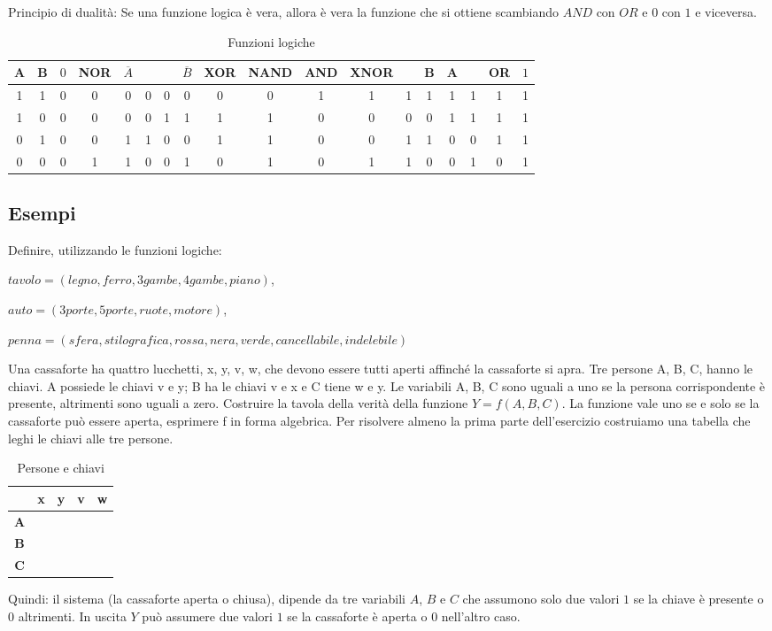 Principio di dualità: Se una funzione logica è vera, allora è vera la funzione che si ottiene scambiando $AND$ con  $OR$ e  $0$ con $1$ e viceversa.

\begin{table} %
	\begin{tabular}{cccccccccccccccccc}
	\toprule
	A & B & $0$ & NOR & $\overline{A}$ &  &  & $\overline{B}$ & XOR & NAND & AND & XNOR &  & B & A &  & OR & $1$ \\ 
	\midrule
	1 & 1 & 0 & 0 & 0 & 0 & 0 & 0 & 0 & 0 & 1 & 1 & 1 & 1 & 1 & 1 & 1 & 1 \\ 
	1 & 0 & 0 & 0 & 0 & 0 & 1 & 1 & 1 & 1 & 0 & 0 & 0 & 0 & 1 & 1 & 1 & 1 \\ 
	0 & 1 & 0 & 0 & 1 & 1 & 0 & 0 & 1 & 1 & 0 & 0 & 1 & 1 & 0 & 0 & 1 & 1 \\ 
	0 & 0 & 0 & 1 & 1 & 0 & 0 & 1 & 0 & 1 & 0 & 1 & 1 & 0 & 0 & 1 & 0 & 1 \\ 
	\bottomrule
	\end{tabular}
	\caption{Funzioni logiche}
	\label{tab:totfunzzionilogiche}
\end{table}
\subsection{Esempi}
\label{sec:Esempiofunzlog}
Definire, utilizzando le funzioni logiche:

$tavolo=(legno,ferro,3gambe,4gambe,piano)$,

$auto=(3 porte,5 porte,ruote,motore)$, 

$penna=(sfera,stilografica,rossa,nera,verde,cancellabile,indelebile)$

Una cassaforte ha quattro lucchetti, x, y, v, w, che devono essere tutti aperti affinché la
cassaforte si apra.  Tre persone A, B, C,  hanno le  chiavi. A possiede le chiavi v e y; 
B ha le chiavi v e x e C tiene w e y. Le variabili A, B, C sono uguali a uno se la persona corrispondente è presente, altrimenti sono uguali a zero. Costruire la tavola
della verità della funzione $Y=f(A,B,C)$. La funzione  vale uno se e solo se la cassaforte può essere  aperta,
 esprimere f in forma algebrica. Per risolvere almeno la prima parte dell'esercizio costruiamo una tabella  che leghi le chiavi alle tre persone.
\begin{table}
	    \centering
		\begin{tabular}{c|cccc}
			& \textbf{x} & \textbf{y} &\textbf{v}& \textbf{w}\\
			\toprule 
			\textbf{A} &  & \textbullet &\textbullet & \\ 
			\textbf{B} & \textbullet &  & \textbullet& \\ 
			\textbf{C} &  & \textbullet & & \textbullet\\ 
			\bottomrule
		\end{tabular}
	\caption[]{Persone e chiavi}
	\label{tab:personeechiavi}
\end{table} 
Quindi: il sistema (la cassaforte aperta o chiusa), dipende da tre variabili $A$, $B$ e $C$ che assumono solo due valori $1$ se la chiave è presente o $0$ altrimenti. In uscita $Y$ può assumere due valori $1$ se la cassaforte è aperta o $0$ nell'altro caso. 

